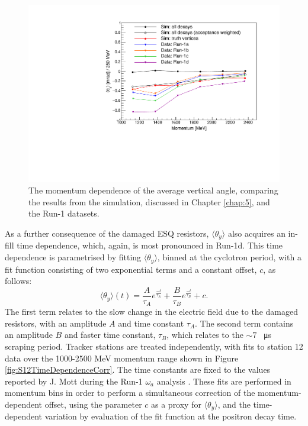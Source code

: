 \begin{figure}[h!]
\centering{}
\includegraphics[trim={0 0 0 0cm},clip,width=.69\textwidth]{Images/Chapter6/verticalOffsetIllustration_noVertCorr.pdf}
\caption{The momentum dependence of the average vertical angle, comparing the results from the simulation, discussed in Chapter \ref{chap:5}, and the Run-1 datasets.}
\label{fig:AvgVertAngleDataAndSim}
\end{figure} 

As a further consequence of the damaged ESQ resistors, $\langle \theta_{y} \rangle$ also acquires an in-fill time dependence, which, again, is most pronounced in Run-1d. This time dependence is parametrised by fitting $\langle \theta_{y} \rangle$, binned at the cyclotron period, with a fit function consisting of two exponential terms and a constant offset, $c$, as follows:
%
\begin{equation}
  \langle \theta_{y} \rangle (t) = \frac{A}{\tau_{A}}e^{\frac{-t}{\tau_{A}}}+\frac{B}{\tau_{B}}e^{\frac{-t}{\tau_{B}}} + c.
  \label{eqn:DoubleExponential}
\end{equation}
% 
The first term relates to the slow change in the electric field due to the damaged resistors, with an amplitude $A$ and time constant $\tau_{A}$. The second term contains an amplitude $B$ and faster time constant, $\tau_{B}$, which relates to the $\sim7$ \SI{}{\micro\second} scraping period. Tracker stations are treated independently, with fits to station 12 data over the 1000-2500 MeV momentum range shown in Figure \ref{fig:S12TimeDependenceCorr}. The time constants are fixed to the values reported by J. Mott during the Run-1 $\omega_{a}$ analysis \cite{MottTimeConstants}. These fits are performed in momentum bins in order to perform a simultaneous correction of the momentum-dependent offset, using the parameter $c$ as a proxy for $\langle \theta_{y} \rangle$, and the time-dependent variation by evaluation of the fit function at the positron decay time. 

